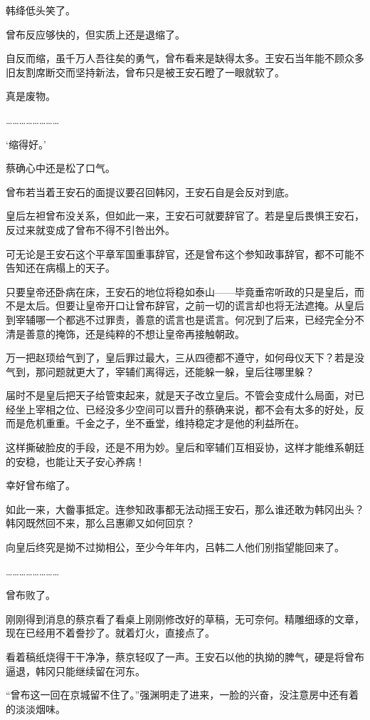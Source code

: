 韩绛低头笑了。

曾布反应够快的，但实质上还是退缩了。

自反而缩，虽千万人吾往矣的勇气，曾布看来是缺得太多。王安石当年能不顾众多旧友割席断交而坚持新法，曾布只是被王安石瞪了一眼就软了。

真是废物。

……………………

‘缩得好。’

蔡确心中还是松了口气。

曾布若当着王安石的面提议要召回韩冈，王安石自是会反对到底。

皇后左袒曾布没关系，但如此一来，王安石可就要辞官了。若是皇后畏惧王安石，反过来就变成了曾布不得不引咎出外。

可无论是王安石这个平章军国重事辞官，还是曾布这个参知政事辞官，都不可能不告知还在病榻上的天子。

只要皇帝还卧病在床，王安石的地位将稳如泰山——毕竟垂帘听政的只是皇后，而不是太后。但要让皇帝开口让曾布辞官，之前一切的谎言却也将无法遮掩。从皇后到宰辅哪一个都逃不过罪责，善意的谎言也是谎言。何况到了后来，已经完全分不清是善意的掩饰，还是纯粹的不想让皇帝再接触朝政。

万一把赵顼给气到了，皇后罪过最大，三从四德都不遵守，如何母仪天下？若是没气到，那问题就更大了，宰辅们离得远，还能躲一躲，皇后往哪里躲？

届时不是皇后把天子给管束起来，就是天子改立皇后。不管会变成什么局面，对已经坐上宰相之位、已经没多少空间可以晋升的蔡确来说，都不会有太多的好处，反而是危机重重。千金之子，坐不垂堂，维持稳定才是他的利益所在。

这样撕破脸皮的手段，还是不用为妙。皇后和宰辅们互相妥协，这样才能维系朝廷的安稳，也能让天子安心养病！

幸好曾布缩了。

如此一来，大齤事抵定。连参知政事都无法动摇王安石，那么谁还敢为韩冈出头？韩冈既然回不来，那么吕惠卿又如何回京？

向皇后终究是拗不过拗相公，至少今年年内，吕韩二人他们别指望能回来了。

……………………

曾布败了。

刚刚得到消息的蔡京看了看桌上刚刚修改好的草稿，无可奈何。精雕细琢的文章，现在已经用不着誊抄了。就着灯火，直接点了。

看着稿纸烧得干干净净，蔡京轻叹了一声。王安石以他的执拗的脾气，硬是将曾布逼退，韩冈只能继续留在河东。

“曾布这一回在京城留不住了。”强渊明走了进来，一脸的兴奋，没注意房中还有着的淡淡烟味。

